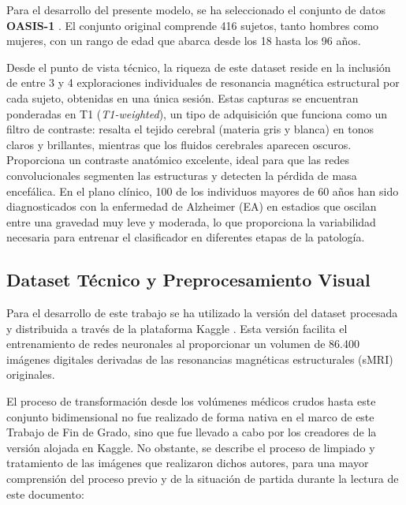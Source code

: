 \documentclass[12pt, oneside, english, spanish]{book}
\begin{document}
Para el desarrollo del presente modelo, se ha seleccionado el conjunto de datos \textbf{OASIS-1} \cite{marcus2007oasis}. El conjunto original comprende 416 sujetos, tanto hombres como mujeres, con un rango de edad que abarca desde los 18 hasta los 96 años.

Desde el punto de vista técnico, la riqueza de este dataset reside en la inclusión de entre 3 y 4 exploraciones individuales de resonancia magnética estructural por cada sujeto, obtenidas en una única sesión. Estas capturas se encuentran ponderadas en T1 (\textit{T1-weighted}), un tipo de adquisición que funciona como un filtro de contraste: resalta el tejido cerebral (materia gris y blanca) en tonos claros y brillantes, mientras que los fluidos cerebrales aparecen oscuros. Proporciona un contraste anatómico excelente, ideal para que las redes convolucionales segmenten las estructuras y detecten la pérdida de masa encefálica. En el plano clínico, 100 de los individuos mayores de 60 años han sido diagnosticados con la enfermedad de Alzheimer (EA) en estadios que oscilan entre una gravedad muy leve y moderada, lo que proporciona la variabilidad necesaria para entrenar el clasificador en diferentes etapas de la patología. 


\subsection{Dataset Técnico y Preprocesamiento Visual} \label{subsec:preprocesamiento_visual}

Para el desarrollo de este trabajo se ha utilizado la versión del dataset procesada y distribuida a través de la plataforma Kaggle \cite{daithal2020oasis}. Esta versión facilita el entrenamiento de redes neuronales al proporcionar un volumen de 86.400 imágenes digitales derivadas de las resonancias magnéticas estructurales (sMRI) originales.

El proceso de transformación desde los volúmenes médicos crudos hasta este conjunto bidimensional no fue realizado de forma nativa en el marco de este Trabajo de Fin de Grado, sino que fue llevado a cabo por los creadores de la versión alojada en Kaggle. No obstante, se describe el proceso de limpiado y tratamiento de las imágenes que realizaron dichos autores, para una mayor comprensión del proceso previo y de la situación de partida durante la lectura de este documento:
\end{document}
